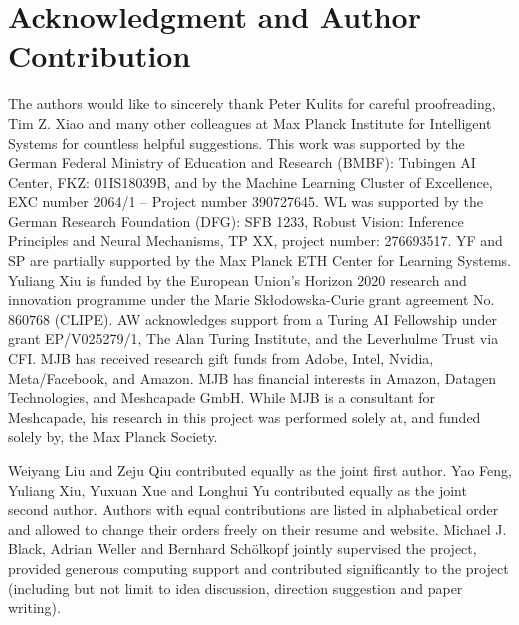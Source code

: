 \documentclass{article} %
\begin{document}
\vspace{-2mm}
\section*{Acknowledgment and Author Contribution}
\vspace{-2mm}


The authors would like to sincerely thank Peter Kulits for careful proofreading, Tim Z. Xiao and many other colleagues at Max Planck Institute for Intelligent Systems for countless helpful suggestions. This work was supported by the German Federal Ministry of Education and Research (BMBF): Tubingen AI Center, FKZ: 01IS18039B, and by the Machine Learning Cluster of Excellence, EXC number 2064/1 – Project number 390727645. WL was supported by the German Research Foundation (DFG): SFB 1233, Robust Vision: Inference Principles and Neural Mechanisms, TP XX, project number: 276693517. YF and SP are partially supported by the Max Planck ETH Center for Learning Systems. Yuliang Xiu is funded by the European Union’s Horizon $2020$ research and innovation programme under the Marie Skłodowska-Curie grant agreement No.$860768$ (CLIPE). AW acknowledges support from a Turing AI Fellowship under grant EP/V025279/1, The Alan Turing Institute, and the Leverhulme Trust via CFI. MJB has received research gift funds from Adobe, Intel, Nvidia, Meta/Facebook, and Amazon. MJB has financial interests in Amazon, Datagen Technologies, and Meshcapade GmbH. While MJB is a consultant for Meshcapade, his research in this project was performed solely at, and funded solely by, the Max Planck Society.

\vspace{-.5mm}

Weiyang Liu and Zeju Qiu contributed equally as the joint first author. Yao Feng, Yuliang Xiu, Yuxuan Xue and Longhui Yu contributed equally as the joint second author. Authors with equal contributions are listed in alphabetical order and allowed to change their orders freely on their resume and website. Michael J. Black, Adrian Weller and Bernhard Schölkopf jointly supervised the project, provided generous computing support and contributed significantly to the project (including but not limit to idea discussion, direction suggestion and paper writing).

\vspace{-.5mm}
\end{document}
